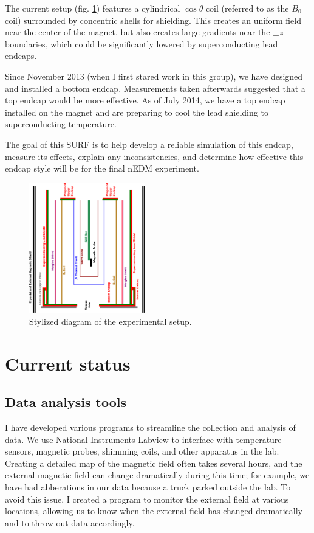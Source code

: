 \documentclass[twocolumn,aps,prb,citeautoscript]{revtex4-1}
\begin{document}
The current setup (fig. \ref{fig:structure})
features a cylindrical $\cos\theta$ coil \cite{coil} (referred to as the $B_0$ coil)
surrounded by concentric shells for shielding.
This creates an uniform field near the center of the magnet, but
also creates large gradients near the $\pm z$ boundaries, which could be significantly
lowered by superconducting lead endcaps.

Since November 2013 (when I first stared work in this group), we have designed and installed
a bottom endcap. Measurements taken afterwards suggested that a top endcap would be more
effective. As of July 2014, we have a top endcap installed on the magnet and are preparing
to cool the lead shielding to superconducting temperature.

The goal of this SURF is to help develop a reliable simulation of
this endcap, measure its effects, explain any inconsistencies, and determine how effective
this endcap style will be for the final nEDM experiment.

\begin{figure}
\includegraphics[width=0.45\textwidth]{../edm_1314year/out.eps}
\caption{\label{fig:structure}Stylized diagram of the experimental
setup.}
\end{figure}

\section{Current status}

\subsection{Data analysis tools}

I have developed various programs to streamline the collection and analysis of data.
We use National Instruments Labview to interface with temperature sensors, magnetic probes, shimming coils,
and other apparatus in the lab. Creating a detailed map of the magnetic field often takes several hours,
and the external magnetic field
can change dramatically during this time; for example, we have had abberations in our data because a truck
parked outside the lab. To avoid this issue, I created a program to monitor the external field at various
locations, allowing us to know when the external field has changed dramatically and to throw out data accordingly.
\end{document}
